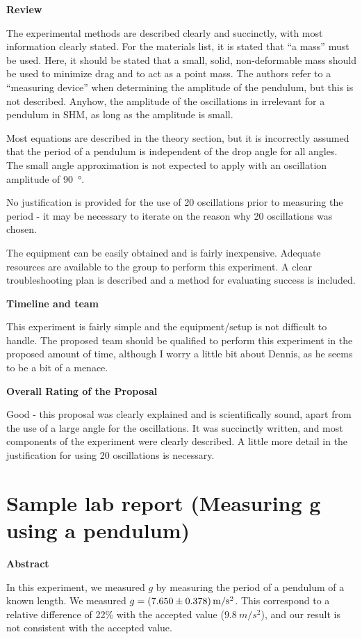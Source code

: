\textbf{Review}

The experimental methods are described clearly and succinctly, with most information clearly stated. For the materials list, it is stated that ``a mass'' must be used. Here, it should be stated that a small, solid, non-deformable mass should be used to minimize drag and to act as a point mass. The authors refer to a ``measuring device'' when determining the amplitude of the pendulum, but this is not described. Anyhow, the amplitude of the oscillations in irrelevant for a pendulum in SHM, as long as the amplitude is small.

Most equations are described in the theory section, but it is incorrectly assumed that the period of a pendulum is independent of the drop angle for all angles. The small angle approximation is not expected to apply with an oscillation amplitude of \SI{90}{\degree}.

No justification is provided for the use of 20 oscillations prior to measuring the period - it may be necessary to iterate on the reason why 20 oscillations was chosen. 

The equipment can be easily obtained and is fairly inexpensive. Adequate resources are available to the group to perform this experiment. A clear troubleshooting plan is described and a method for evaluating success is included. 

\textbf{Timeline and team}

This experiment is fairly simple and the equipment/setup is not difficult to handle. The proposed team should be qualified to perform this experiment in the proposed amount of time, although I worry a little bit about Dennis, as he seems to be a bit of a menace.

\textbf{Overall Rating of the Proposal}

Good - this proposal was clearly explained and is scientifically sound, apart from the use of a large angle for the oscillations. It was succinctly written, and most components of the experiment were clearly described. A little more detail in the justification for using 20 oscillations is necessary. 


\newpage
\section{Sample lab report (Measuring g using a pendulum)}
 \vspace{0.25cm}
\textbf{Abstract}

In this experiment, we measured $g$ by measuring the period of a pendulum of a known length. We measured $g = \SI{7.65\pm 0.378}{m/s^2}$. This correspond to a relative difference of 22\% with the accepted value ($\SI{9.8}{m/s^2}$), and our result is not consistent with the accepted value.


